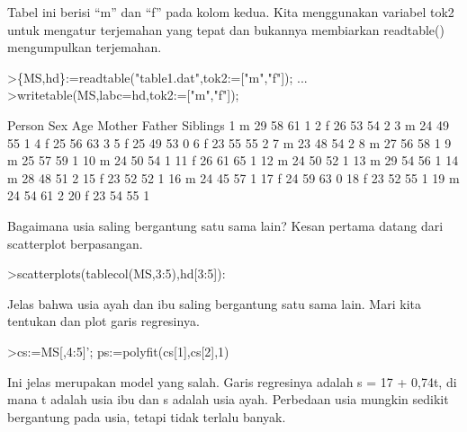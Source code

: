 \documentclass{article}
\begin{document}
\begin{eulernotebook}
\begin{eulercomment}
Tabel ini berisi “m” dan “f” pada kolom kedua. Kita menggunakan
variabel tok2 untuk mengatur terjemahan yang tepat dan bukannya
membiarkan readtable() mengumpulkan terjemahan.
\end{eulercomment}
\begin{eulerprompt}
>\{MS,hd\}:=readtable("table1.dat",tok2:=["m","f"]);  ...
>writetable(MS,labc=hd,tok2:=["m","f"]);
\end{eulerprompt}
\begin{euleroutput}
      Person       Sex       Age    Mother    Father  Siblings
           1         m        29        58        61         1
           2         f        26        53        54         2
           3         m        24        49        55         1
           4         f        25        56        63         3
           5         f        25        49        53         0
           6         f        23        55        55         2
           7         m        23        48        54         2
           8         m        27        56        58         1
           9         m        25        57        59         1
          10         m        24        50        54         1
          11         f        26        61        65         1
          12         m        24        50        52         1
          13         m        29        54        56         1
          14         m        28        48        51         2
          15         f        23        52        52         1
          16         m        24        45        57         1
          17         f        24        59        63         0
          18         f        23        52        55         1
          19         m        24        54        61         2
          20         f        23        54        55         1
\end{euleroutput}
\begin{eulercomment}
Bagaimana usia saling bergantung satu sama lain? Kesan pertama datang
dari scatterplot berpasangan.
\end{eulercomment}
\begin{eulerprompt}
>scatterplots(tablecol(MS,3:5),hd[3:5]):
\end{eulerprompt}
\begin{eulercomment}
Jelas bahwa usia ayah dan ibu saling bergantung satu sama lain. Mari
kita tentukan dan plot garis regresinya.
\end{eulercomment}
\begin{eulerprompt}
>cs:=MS[,4:5]'; ps:=polyfit(cs[1],cs[2],1)
\end{eulerprompt}
\begin{euleroutput}
  [17.3789,  0.740964]
\end{euleroutput}
\begin{eulercomment}
Ini jelas merupakan model yang salah. Garis regresinya adalah s = 17 +
0,74t, di mana t adalah usia ibu dan s adalah usia ayah. Perbedaan
usia mungkin sedikit bergantung pada usia, tetapi tidak terlalu
banyak.


\end{eulercomment}
\end{eulernotebook}
\end{document}
